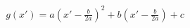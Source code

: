 \documentclass[preview]{standalone}
\begin{document}
\begin{align*}
g(x') = a(x' - \frac{b}{2a})^2 + b(x' - \frac{b}{2a}) + c
\end{align*}
\end{document}
